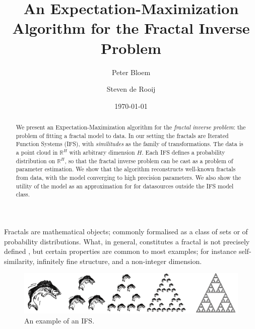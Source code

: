\documentclass[reprint,amsmath,amssymb,aps,prl]{revtex4-1}
\begin{document}

\title{An Expectation-Maximization Algorithm for the Fractal Inverse Problem}

\author{Peter Bloem}

\author{Steven de Rooij}

\date{\today}

\begin{abstract}
\noindent We present an Expectation-Maximization algorithm for the \emph{fractal inverse problem}: the problem of fitting a fractal model to data. In our setting the fractals are Iterated Function Systems (IFS), with \emph{similitudes} as the family of transformations. The data is a point cloud in ${\mathbb R}^H$ with arbitrary dimension $H$. Each IFS defines a probability distribution on ${\mathbb R}^H$, so that the fractal inverse problem can be cast as a problem of parameter estimation. We show that the algorithm reconstructs well-known fractals from data, with the model converging to high precision parameters. We also show the utility of the model as an approximation for for datasources outside the IFS model class. 
\end{abstract}

\maketitle

\noindent Fractals are mathematical objects; commonly formalised as a class of sets or of probability distributions. What, in general, constitutes a fractal is not precisely defined \footnotemark[1], but certain properties are common to most examples; for instance self-similarity, infinitely fine structure, and a non-integer dimension.


\begin{figure}[b]
  \includegraphics[width=\linewidth]{../img/copies.png}
  \caption{An example of an IFS.}
\end{figure}
\end{document}

